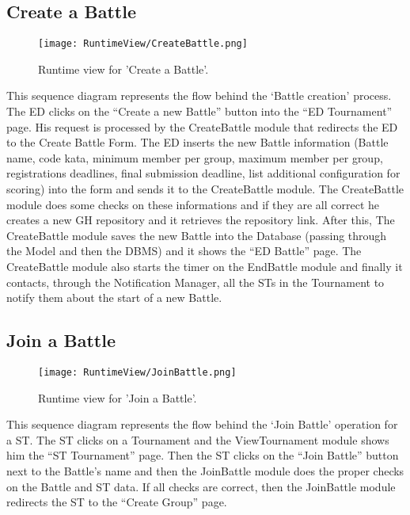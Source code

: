 \subsection{Create a Battle}
\begin{figure}[H]
    \begin{center}
        \texttt{[image: RuntimeView/CreateBattle.png]}
        \caption{Runtime view for 'Create a Battle'.}
        \label{fig:runtime_createbattle}%
    \end{center}
\end{figure}
This sequence diagram represents the flow behind the ‘Battle creation’ 
process. The ED clicks on the “Create a new Battle” button into the “ED Tournament” page. His request is processed by the CreateBattle module that redirects the ED to the Create Battle Form. The ED inserts the new Battle information (Battle name, code kata,  minimum member per group, maximum member per group, registrations deadlines, final submission deadline, list additional configuration for scoring) into the form and sends it to the CreateBattle module. The CreateBattle module does some checks on these informations and if they are all correct he creates a new GH repository and it retrieves the repository link. After this, The CreateBattle module saves the new Battle into the Database (passing through the Model and then the DBMS) and it shows the “ED Battle” page. The CreateBattle module also starts the timer on the EndBattle module and finally it contacts, through the Notification Manager, all the STs in the Tournament to notify them about the start of a new Battle.



\subsection{Join a Battle}
\begin{figure}[H]
    \begin{center}
        \texttt{[image: RuntimeView/JoinBattle.png]}
        \caption{Runtime view for 'Join a Battle'.}
        \label{fig:runtime_joinbattle}%
    \end{center}
\end{figure}
This sequence diagram represents the flow behind the ‘Join Battle’ operation for a ST. The ST clicks on a Tournament and the ViewTournament module shows him the “ST Tournament” page. Then the ST clicks on the “Join Battle” button next to the Battle’s name and then the JoinBattle module does the proper checks on the Battle and ST data. If all checks are correct, then the JoinBattle module redirects the ST to the “Create Group” page.


